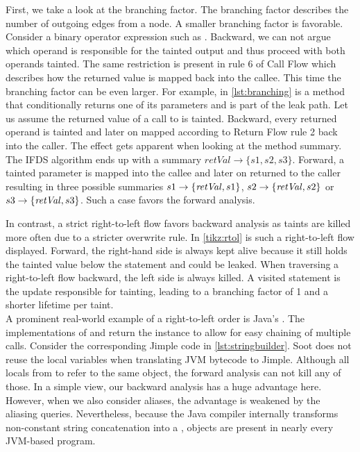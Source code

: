 \documentclass[../draft.tex]{subfiles}
\begin{document}
    First, we take a look at the branching factor.
    The branching factor describes the number of outgoing edges from a node.
    A smaller branching factor is favorable.
    Consider a binary operator expression such as .
    Backward, we can not argue which operand is responsible for the tainted output and thus proceed with both operands tainted.
    The same restriction is present in rule 6 of Call Flow which describes how the returned value is mapped back into the callee.
    This time the branching factor can be even larger.
    For example, in \autoref{lst:branching} is a method that conditionally returns one of its parameters and is part of the leak path.
    Let us assume the returned value of a call to  is tainted. Backward, every returned operand is tainted and later on mapped according to Return Flow rule 2 back into the caller.
    The effect gets apparent when looking at the method summary.
    The IFDS algorithm ends up with a summary $\mathit{retVal} \rightarrow \{s1, s2, s3\}$.
    Forward, a tainted parameter is mapped into the callee and later on returned to the caller resulting in three possible summaries  $s1 \rightarrow \mathit\{\mathit{retVal}, s1\}$, $s2 \rightarrow \mathit\{\mathit{retVal}, s2\}$ or $s3 \rightarrow \mathit\{\mathit{retVal}, s3\}$.
    Such a case favors the forward analysis.

    In contrast, a strict right-to-left flow favors backward analysis as taints are killed more often due to a stricter overwrite rule.
    In \autoref{tikz:rtol} is such a right-to-left flow displayed.
    Forward, the right-hand side is always kept alive because it still holds the tainted value below the statement and could be leaked.
    When traversing a right-to-left flow backward, the left side is always killed.
    A visited statement is the update responsible for tainting, leading to a branching factor of 1 and a shorter lifetime per taint.\\
    A prominent real-world example of a right-to-left order is Java's .
    The implementations of  and  return the  instance to allow for easy chaining of multiple calls.
    Consider the corresponding Jimple code in \autoref{lst:stringbuilder}.
    Soot does not reuse the local variables when translating JVM bytecode to Jimple\footnotemark{}.
    Although all locals from  to  refer to the same object, the forward analysis can not kill any of those.
    In a simple view, our backward analysis has a huge advantage here.
    However, when we also consider aliases, the advantage is weakened by the aliasing queries.
    Nevertheless, because the Java compiler internally transforms non-constant string concatenation into a ,  objects are present in nearly every JVM-based program.
\end{document}
